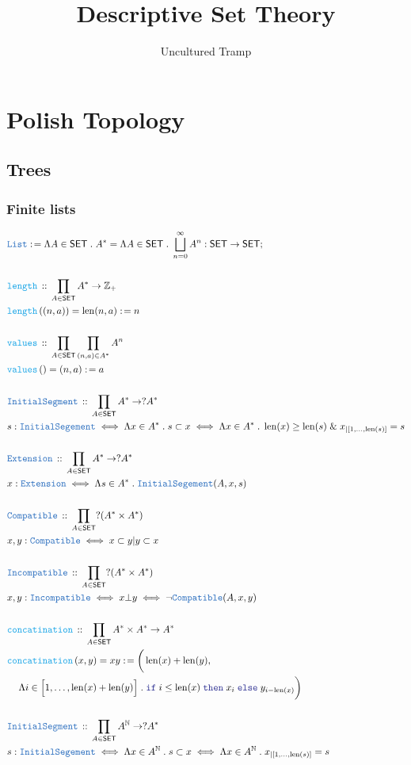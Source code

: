 \documentclass[12pt]{scrartcl}
\author{Uncultured Tramp}
\title{Descriptive Set Theory}
\newcommand{\TYPE}[1]{\textcolor{NavyBlue}{\mathtt{#1}}}
\newcommand{\FUNC}[1]{\textcolor{Cerulean}{\mathtt{#1}}}
\newcommand{\LOGIC}[1]{\textcolor{Blue}{\mathtt{#1}}}
\renewcommand{\.}{\; . \;}
\newcommand{\de}{: \kern 0.1pc =}
\newcommand{\If}{\LOGIC{if} \;}
\newcommand{\Then}{ \; \LOGIC{then} \;}
\newcommand{\Else}{\; \LOGIC{else} \;}
\newcommand{\Act}[1]{\left( #1 \right)}
\newcommand{\DeclareType}[2]{& \TYPE{#1} \, :: \, #2 \\}
\newcommand{\DefineType}[3]{& #1 : \TYPE{#2} \iff #3 \\}
\newcommand{\DefineNamedType}[4]{& #1 : \TYPE{#2} \iff #3 \iff #4 \\}
\newcommand{\DeclareFunc}[2]{& \FUNC{#1} \, :: \, #2 \\}
\newcommand{\DefineNamedFunc}[4]{&  \FUNC{#1}\Act{#2} = #3 \de #4 \\}
\newcommand{\NewLine}{\\ & \kern 1pc}
\newcommand{\Page}[1]{ \begin{align*} #1 \end{align*}   }
\renewcommand{\And}{\; \& \;}
\newcommand{\Int}{\mathbb{Z} }
\newcommand{\Nat}{\mathbb{N} }
\newcommand{\Conclude}[3]{& #1 \de #2 : #3; \\}
\newcommand{\SET}{\mathsf{SET}}
\newcommand{\IS}{\TYPE{InitialSegement}}
\newcommand{\FS}[1]{{#1}{}^*}
\newcommand{\Ext}{\TYPE{Extension}}
\DeclareMathOperator{\len}{len}
\newcommand{\inits}[2]{{#1}_{|\left[1,\ldots,#2\right]}}
\begin{document}
\maketitle
\newpage
\tableofcontents
\newpage
\section{Polish Topology}
\subsection{Trees}
\subsubsection{Finite lists}
\Page{
	\Conclude{\TYPE{List}}{ 
		\Lambda A \in \SET \. 
		\FS{A} = 
		\Lambda A \in \SET \. 
		\bigsqcup^\infty_{n=0}  A^n 
	}{        
		\SET \to \SET
	}
	\\
	\DeclareFunc{length}{ \prod_{A \in \SET} \FS{A} \to \Int_+  }
	\DefineNamedFunc{length}{(n,a)}{\len (n,a)}{n}
	\\
	\DeclareFunc{values}{ \prod_{A \in \SET} \prod_{(n,a) \in   \FS{A}} A^n }
	\DefineNamedFunc{values}{}{(n,a)}{a}
	\\
	\DeclareType{InitialSegment}
	{  
		\prod_{A \in \SET} \FS{A} \to ?\FS{A}
	}
	\DefineNamedType{s}{\IS}{\Lambda x \in \FS{A} \. s \subset x}
	{\Lambda x \in \FS{A} \. \len(x) \ge \len(s) \And x_{|[1,\ldots,\len(s)]} = s }
	\\
	\DeclareType{\Ext}
	{  
		\prod_{A \in \SET} \FS{A} \to ?\FS{A}
	}
	\DefineType{x}{\Ext}{\Lambda s \in \FS{A} \. \IS(A,x,s)}
	\\
	\DeclareType{Compatible}{\prod_{A \in \SET} ?(\FS{A}\times\FS{A})}
	\DefineType{x,y}{Compatible}{x \subset y | y \subset x}
	\\
	\DeclareType{Incompatible}{\prod_{A \in \SET} ?(\FS{A}\times\FS{A})}
	\DefineNamedType{x,y}{Incompatible}{x \bot y}{ \neg \TYPE{Compatible}(A,x,y)   }
	\\
	\DeclareFunc{concatination}{ \prod_{A \in \SET} \FS{A} \times \FS{A} \to \FS{A}}
	\DefineNamedFunc{concatination}{x,y}{xy}{ 
		\bigg( \len(x) + \len(y), \NewLine
			\Lambda i \in \Big[1,\ldots, \len(x) + \len(y) \Big] \.
			\If i \le \len(x) \Then x_i \Else   y_{i-\len(x)}
		\bigg)
	}
	\\
	\DeclareType{InitialSegment}
	{  
		\prod_{A \in \SET} A^\Nat \to ?\FS{A}
	}
	\DefineNamedType{s}{\IS}{\Lambda x \in A^\Nat \. s \subset x}
	{\Lambda x \in A^\Nat \.  \inits{x}{\len(s)} = s }
}
\end{document}
